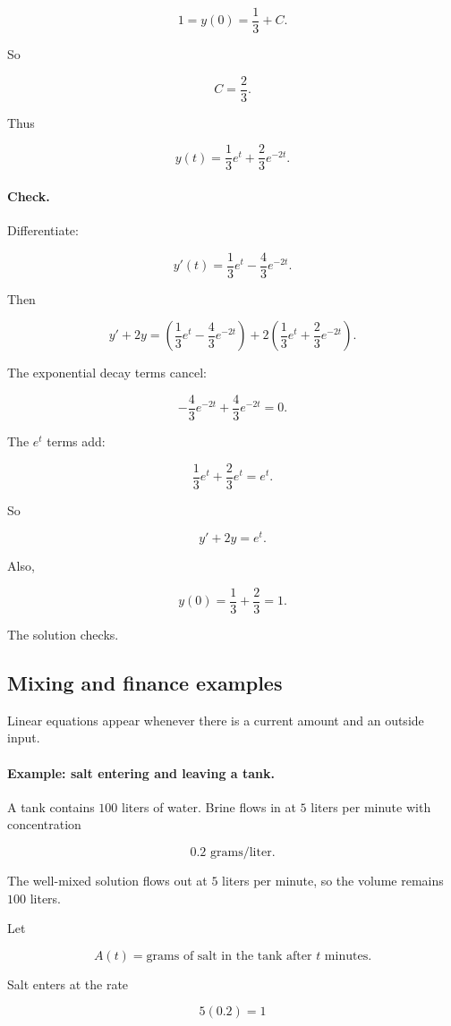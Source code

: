 \[
1=y(0)=\frac13+C.
\]

So

\[
C=\frac23.
\]

Thus

\[
\boxed{
y(t)=\frac13e^t+\frac23e^{-2t}.
}
\]

\paragraph{Check.}
Differentiate:

\[
y'(t)=\frac13e^t-\frac43e^{-2t}.
\]

Then

\[
y'+2y
=
\left(\frac13e^t-\frac43e^{-2t}\right)
+
2\left(\frac13e^t+\frac23e^{-2t}\right).
\]

The exponential decay terms cancel:

\[
-\frac43e^{-2t}+\frac43e^{-2t}=0.
\]

The \(e^t\) terms add:

\[
\frac13e^t+\frac23e^t=e^t.
\]

So

\[
y'+2y=e^t.
\]

Also,

\[
y(0)=\frac13+\frac23=1.
\]

The solution checks.

\subsection{Mixing and finance examples}
\label{subsec:linear-mixing-finance-examples}

Linear equations appear whenever there is a current amount and an outside input.

\paragraph{Example: salt entering and leaving a tank.}
A tank contains \(100\) liters of water.  Brine flows in at \(5\) liters per minute with
concentration

\[
0.2\text{ grams/liter}.
\]

The well-mixed solution flows out at \(5\) liters per minute, so the volume remains
\(100\) liters.

Let

\[
A(t)=\text{grams of salt in the tank after \(t\) minutes}.
\]

Salt enters at the rate

\[
5(0.2)=1
\]

